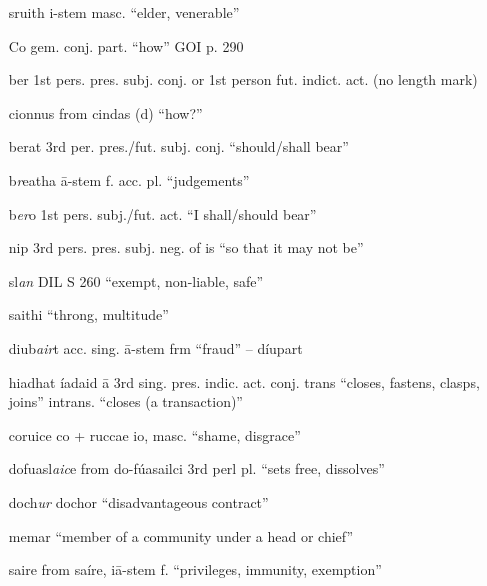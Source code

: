 \documentclass[11pt]{article}
\begin{document}
\begin{enumerate}
  \item[sruith] i-stem masc. \enquote{elder, venerable}

  \item[Co] gem. conj. part. \enquote{how} GOI p. 290

  \item[ber] 1st pers. pres. subj. conj. or 1st person fut. indict. act. (no length mark)

  \item[cionnus] from cindas (d) \enquote{how?}

  \item[berat] 3rd per. pres./fut. subj. conj. \enquote{should/shall bear}

  \item[b\emph{r}eatha] \={a}-stem f. acc. pl. \enquote{judgements}

  \item[b\emph{er}o] 1st pers. subj./fut. act. \enquote{I shall/should bear} 

  \item[nip] 3rd pers. pres. subj. neg. of is \enquote{so that it may not be}

  \item[sl\emph{an}] DIL S 260 \enquote{exempt, non-liable, safe}

  \item[saithi] \enquote{throng, multitude}

  \item[diub\emph{air}t] acc. sing. \={a}-stem frm \enquote{fraud} -- d\'{i}upart

  \item[hiadhat] \'{i}adaid \={a} 3rd sing. pres. indic. act. conj. trans \enquote{closes, fastens, clasps, joins} intrans. \enquote{closes (a transaction)}

  \item[coruice] co + ruccae io, masc. \enquote{shame, disgrace}

  \item[dofuasl\emph{aic}e] from do-f\'{u}asailci 3rd perl pl. \enquote{sets free, dissolves}

  \item[doch\emph{ur}] dochor \enquote{disadvantageous contract}

  \item[memar] \enquote{member of a community under a head or chief}

  \item[saire] from sa\'{i}re, i\={a}-stem f. \enquote{privileges, immunity, exemption}


\end{enumerate}
\end{document}
